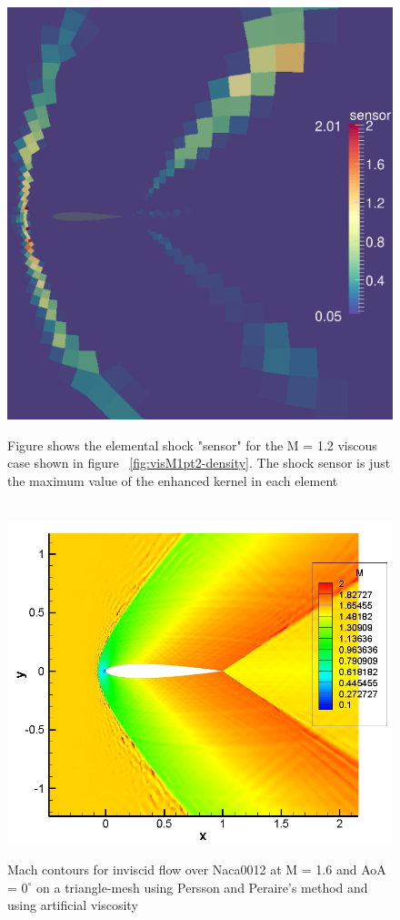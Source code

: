 \begin{figure}[h] \tt
\centering
\includegraphics[angle=0, scale = 0.55]{./figures/sensor-t1050010-spectral}
\caption{Figure shows the elemental shock "sensor" for the M = 1.2 viscous case shown in figure ~\ref{fig:visM1pt2-density}. The shock sensor is just the maximum value of the enhanced kernel in each element}
\label{fig:sensor}
\end{figure}

\begin{figure}[h] \tt
\centering
\includegraphics[angle=0, scale = 0.68]{./figures/M1pt6order3-inv-720ktime-mach.jpg} \\
\caption{Mach contours for inviscid flow over Naca0012 at M = 1.6 and AoA = $0^{\circ} $ on a triangle-mesh using Persson and Peraire's method and using artificial viscosity}
\label{fig:inv_mach}
\end{figure}

